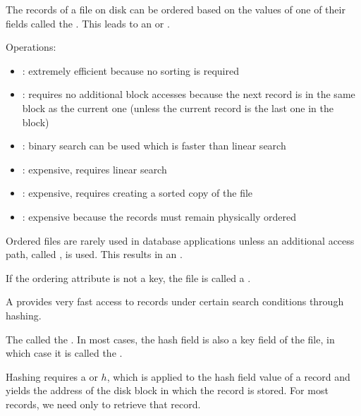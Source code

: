   \par The records of a file on disk can be ordered based on the values of one of their fields called the . This leads to an  or .
  \par Operations:
  \begin{itemize}
    \item {}: extremely efficient because no sorting is required
    \item {}: requires no additional block accesses because the next record is in the same block as the current one (unless the current record is the last one in the block)
    \item {}: binary search can be used which is faster than linear search
    \item {}: expensive, requires linear search
    \item {}: expensive, requires creating a sorted copy of the file
    \item {}: expensive because the records must remain physically ordered
  \end{itemize}
  \par Ordered files are rarely used in database applications unless an additional access path, called , is used. This results in an .
  \par If the ordering attribute is not a key, the file is called a .


  \par A  provides very fast access to records under certain search conditions through hashing.
  \par The   called the . In most cases, the hash field is also a key field of the file, in which case it is called the .
  \par Hashing requires a  or  $h$, which is applied to the hash field value of a record and yields the address of the disk block in which the record is stored. For most records, we need only  to retrieve that record.

